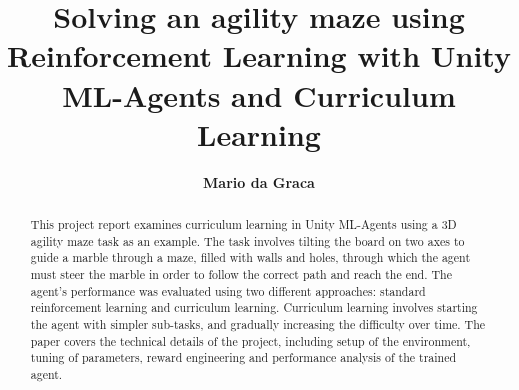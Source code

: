 \documentclass[runningheads]{llncs}
\begin{document}
%
    \title{Solving an agility maze using Reinforcement Learning with Unity ML-Agents and Curriculum Learning}
%
%
    \author{\textbf{Mario da Graca}}
%
%
%
    \maketitle              %
%
    \begin{abstract}
        This project report examines curriculum learning in Unity ML-Agents using a 3D agility maze task as an example.
        The task involves tilting the board on two axes to guide a marble through a maze, filled with walls and holes, through which the agent must steer the marble in order to follow the correct path and reach the end.
        The agent's performance was evaluated using two different approaches: standard reinforcement learning and curriculum learning.
        Curriculum learning involves starting the agent with simpler sub-tasks, and gradually increasing the difficulty over time.
        The paper covers the technical details of the project, including setup of the environment, tuning of parameters, reward engineering and performance analysis of the trained agent.

    \end{abstract}

    

    \clearpage
    
    
%
\end{document}
